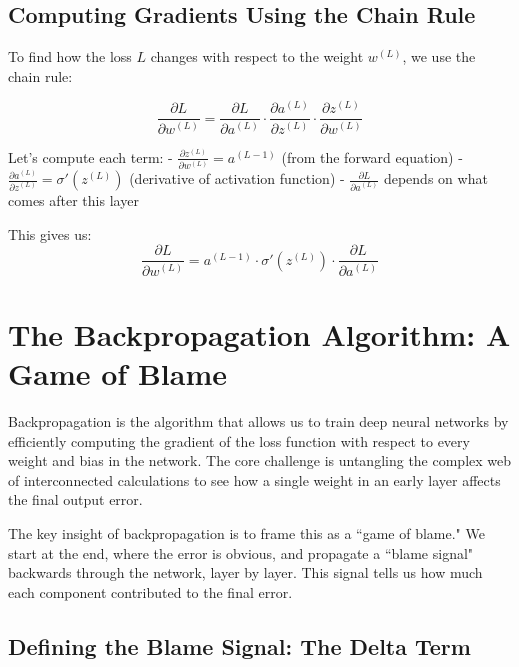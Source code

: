 \documentclass{article}
\begin{document}
\subsection{Computing Gradients Using the Chain Rule}

To find how the loss $L$ changes with respect to the weight $w^{(L)}$, we use the chain rule:

\begin{equation}
    \frac{\partial L}{\partial w^{(L)}} = \frac{\partial L}{\partial a^{(L)}} \cdot \frac{\partial a^{(L)}}{\partial z^{(L)}} \cdot \frac{\partial z^{(L)}}{\partial w^{(L)}}
\end{equation}

Let's compute each term:
- $\frac{\partial z^{(L)}}{\partial w^{(L)}} = a^{(L-1)}$ (from the forward equation)
- $\frac{\partial a^{(L)}}{\partial z^{(L)}} = \sigma'(z^{(L)})$ (derivative of activation function)
- $\frac{\partial L}{\partial a^{(L)}}$ depends on what comes after this layer

This gives us:
\begin{equation}
    \frac{\partial L}{\partial w^{(L)}} = a^{(L-1)} \cdot \sigma'(z^{(L)}) \cdot \frac{\partial L}{\partial a^{(L)}}
\end{equation}





\section{The Backpropagation Algorithm: A Game of Blame}

Backpropagation is the algorithm that allows us to train deep neural networks by efficiently computing the gradient of the loss function with respect to every weight and bias in the network. The core challenge is untangling the complex web of interconnected calculations to see how a single weight in an early layer affects the final output error.

The key insight of backpropagation is to frame this as a ``game of blame." We start at the end, where the error is obvious, and propagate a ``blame signal" backwards through the network, layer by layer. This signal tells us how much each component contributed to the final error.

\subsection{Defining the Blame Signal: The Delta Term}
\end{document}

